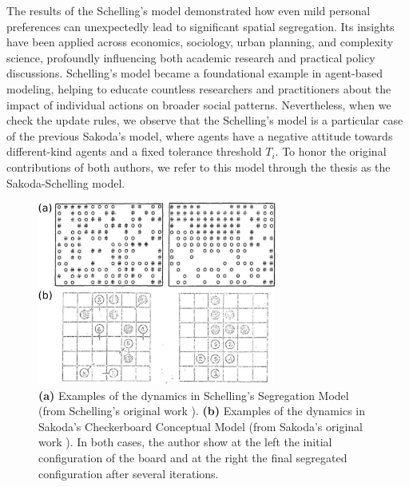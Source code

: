 The results of the Schelling's model demonstrated how even mild personal preferences can unexpectedly lead to significant spatial segregation. Its insights have been applied across economics, sociology, urban planning, and complexity science, profoundly influencing both academic research and practical policy discussions. Schelling's model became a foundational example in agent-based modeling, helping to educate countless researchers and practitioners about the impact of individual actions on broader social patterns. Nevertheless, when we check the update rules, we observe that the Schelling's model is a particular case of the previous Sakoda's model, where agents have a negative attitude towards different-kind agents and a fixed tolerance threshold $T_i$. To honor the original contributions of both authors, we refer to this model through the thesis as the Sakoda-Schelling model.

\begin{figure}
    \centering
    \captionsetup{font=sf}
    \includegraphics[width=0.7\textwidth]{Figs/Introduction/schelling_diagrams.pdf}
    \caption[Schelling and Sakoda checkerboard examples]{\textbf{(a)} Examples of the dynamics in Schelling's Segregation Model (from Schelling's original work \cite{Schelling}). \textbf{(b)} Examples of the dynamics in Sakoda’s Checkerboard Conceptual Model (from Sakoda's original work \cite{sakoda1949minidoka}). In both cases, the author show at the left the initial configuration of the board and at the right the final segregated configuration after several iterations.}
    \label{fig:Schelling_fig}
\end{figure}

